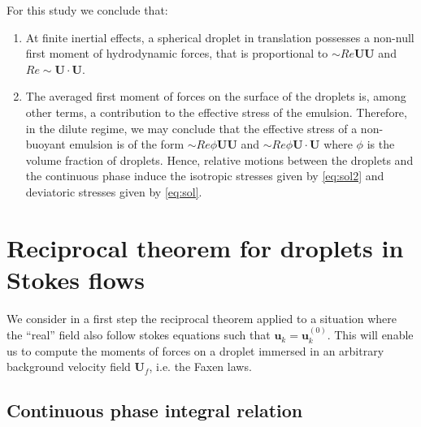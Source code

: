 For this study we conclude that: 
\begin{enumerate}
    \item 
    At finite inertial effects, a spherical droplet in translation possesses a non-null first moment of hydrodynamic forces, that is proportional to $\sim Re \textbf{UU}$ and $Re\sim \textbf{U}\cdot\textbf{U}$. 
    \item 
    The averaged first moment of forces on the surface of the droplets is, among other terms, a contribution to the effective stress of the emulsion. 
    Therefore, in the dilute regime, we may conclude that the effective stress of a non-buoyant emulsion is of the form $\sim Re \phi \textbf{UU}$ and $\sim Re \phi \textbf{U}\cdot \textbf{U}$ where $\phi$ is the volume fraction of droplets.
    Hence, relative motions between the droplets and the continuous phase induce the isotropic stresses given by \ref{eq:sol2} and deviatoric stresses given by \ref{eq:sol}. 
\end{enumerate}

\appendix

\section{Reciprocal theorem for droplets in Stokes flows}
\label{app:faxen}
We consider in a first step the reciprocal theorem applied to a situation where the ``real'' field also follow stokes equations such that $\textbf{u}_k =\textbf{u}_k^{(0)}$. 
This will enable us to compute the moments of forces on a droplet immersed in an arbitrary background velocity field $\textbf{U}_f$, i.e. the Faxen laws. 


\subsection{Continuous phase integral relation}

